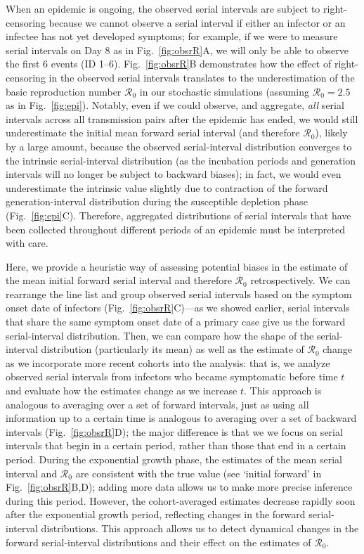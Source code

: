 \documentclass[12pt]{article}
\newcommand{\fref}[1]{Fig.~\ref{fig:#1}}
\newcommand{\Rx}[1]{\ensuremath{{\mathcal R}_{#1}}\xspace}
\newcommand{\Ro}{\Rx{0}}
\begin{document}
When an epidemic is ongoing, the observed serial intervals are subject to right-censoring because we cannot observe a serial interval if either an infector or an infectee has not yet developed symptoms;
for example, if we were to measure serial intervals on Day 8 as in \fref{obsrR}A, we will only be able to observe the first 6 events (ID 1--6).
\fref{obsrR}B demonstrates how the effect of right-censoring in the observed serial intervals translates to the underestimation of the basic reproduction number \Ro in our stochastic simulations (assuming $\Ro = 2.5$ as in \fref{epi}).
Notably, even if we could observe, and aggregate, \emph{all} serial intervals across all transmission pairs after the epidemic has ended, we would still underestimate the initial mean forward serial interval (and therefore \Ro), likely by a large amount, because the observed serial-interval distribution converges to the intrinsic serial-interval distribution (as the incubation periods and generation intervals will no longer be subject to backward biases);
in fact, we would even underestimate the intrinsic value slightly due to contraction of the forward generation-interval distribution during the susceptible depletion phase (\fref{epi}C).
Therefore, aggregated distributions of serial intervals that have been collected throughout different periods of an epidemic must be interpreted with care.

Here, we provide a heuristic way of assessing potential biases in the estimate of the mean initial forward serial interval and therefore \Ro retrospectively.
We can rearrange the line list and group observed serial intervals based on the symptom onset date of infectors (\fref{obsrR}C)---as we showed earlier, serial intervals that share the same symptom onset date of a primary case give us the forward serial-interval distribution.
Then, we can compare how the shape of the serial-interval distribution (particularly its mean) as well as the estimate of \Ro change as we incorporate more recent cohorts into the analysis:
that is, we analyze observed serial intervals from infectors who became symptomatic before time $t$ and evaluate how the estimates change as we increase $t$.
This approach is analogous to averaging over a set of forward intervals, just as using all information up to a certain time is analogous to averaging over a set of backward intervals (\fref{obsrR}D);
the major difference is that we we focus on serial intervals that begin in a certain period, rather than those that end in a certain period.
During the exponential growth phase, the estimates of the mean serial interval and \Ro are consistent with the true value (see `initial forward' in \fref{obsrR}B,D);
adding more data allows us to make more precise inference during this period.
However, the cohort-averaged estimates decrease rapidly soon after the exponential growth period, reflecting changes in the forward serial-interval distributions.
This approach allows us to detect dynamical changes in the forward serial-interval distributions and their effect on the estimates of \Ro.
\end{document}
